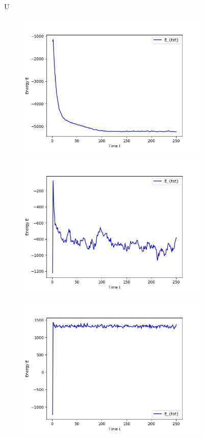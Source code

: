 \begin{figure}[ht]
U
\hfill
\begin{subfigure}{0.3\textwidth}
\includegraphics[width=\textwidth]{../dat/Total_Energy_T0d3.png}
\end{subfigure}
\hfill
\begin{subfigure}{0.3\textwidth}
\includegraphics[width=\textwidth]{../dat/Total_Energy_T1d0.png}
\end{subfigure}
\hfill
\begin{subfigure}{0.3\textwidth}
\includegraphics[width=\textwidth]{../dat/Total_Energy_T2d0.png}

\end{subfigure}
\end{figure}
